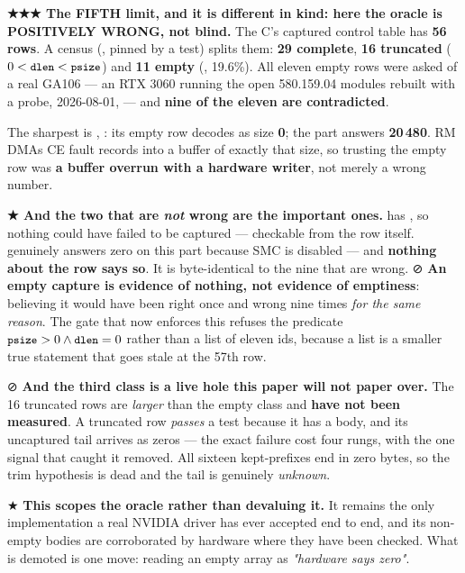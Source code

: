 \documentclass[10.5pt]{article}
\begin{document}
\begin{warnbox}\small
\textbf{★★★ The FIFTH limit, and it is different in kind: here the oracle is POSITIVELY WRONG,
not blind.} The C's captured control table  has \textbf{56 rows}.
A census (, pinned by a test) splits them: \textbf{29 complete},
\textbf{16 truncated} ($0 < \texttt{\small dlen} < \texttt{\small psize}$) and \textbf{11 empty}
(, 19.6\%). All eleven empty rows were asked of a real GA106 — an RTX 3060 running
the open 580.159.04 modules rebuilt with a probe, 2026-08-01,  —
and \textbf{nine of the eleven are contradicted}.

\smallskip
The sharpest is , : its empty row
decodes as size \textbf{0}; the part answers \textbf{20\,480}. RM DMAs CE fault records into a
buffer of exactly that size, so trusting the empty row was \textbf{a buffer overrun with a
hardware writer}, not merely a wrong number.

\smallskip
\textbf{★ And the two that are \emph{not} wrong are the important ones.}  has
, so nothing could have failed to be captured — checkable from the row itself.
 genuinely answers zero on this part because SMC is disabled — and
\textbf{nothing about the row says so}. It is byte-identical to the nine that are wrong.
⊘ \textbf{An empty capture is evidence of nothing, not evidence of emptiness}: believing it
would have been right once and wrong nine times \emph{for the same reason}. The gate that now
enforces this refuses the predicate $\texttt{\small psize} > 0 \wedge \texttt{\small dlen} = 0$ rather than a list
of eleven ids, because a list is a smaller true statement that goes stale at the 57th row.

\smallskip
⊘ \textbf{And the third class is a live hole this paper will not paper over.} The 16 truncated
rows are \emph{larger} than the empty class and \textbf{have not been measured}. A truncated row
\emph{passes} a  test because it has a body, and its uncaptured tail arrives as
zeros — the exact failure  cost four rungs, with the one signal that caught it
removed. All sixteen kept-prefixes end in zero bytes, so the trim hypothesis is dead and the tail
is genuinely \emph{unknown}.

\smallskip
★ \textbf{This scopes the oracle rather than devaluing it.} It remains the only implementation a
real NVIDIA driver has ever accepted end to end, and its non-empty bodies are corroborated by
hardware where they have been checked. What is demoted is one move: reading an empty
 array as \emph{"hardware says zero"}.
\end{warnbox}
\end{document}
